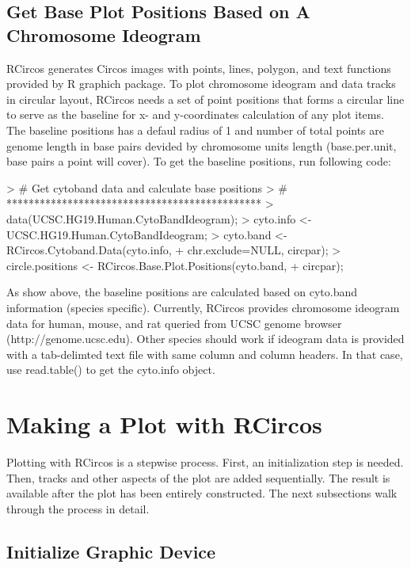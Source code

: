 \documentclass{article}
\begin{document}
\subsection{Get Base Plot Positions Based on A Chromosome Ideogram}

RCircos generates Circos images with points, lines, polygon, and text functions provided by R graphich package. To plot chromosome ideogram and data tracks in circular layout, RCircos needs a set of point positions that forms a circular line to serve as the baseline for x- and y-coordinates calculation of any plot items. The baseline positions has a defaul radius of 1 and number of total points are genome length in base pairs devided by chromosome units length (base.per.unit, base pairs a point will cover).  To get the baseline positions, run following code:

\begin{Schunk}
\begin{Sinput}
> #	Get cytoband data and calculate base positions
> #	**********************************************
> data(UCSC.HG19.Human.CytoBandIdeogram);
> cyto.info <- UCSC.HG19.Human.CytoBandIdeogram;
> cyto.band <- RCircos.Cytoband.Data(cyto.info, 
+ 			chr.exclude=NULL, circpar);
> circle.positions <- RCircos.Base.Plot.Positions(cyto.band, 
+ 			circpar);
\end{Sinput}
\end{Schunk}

As show above, the baseline positions are calculated based on cyto.band information (species specific). Currently, RCircos provides chromosome ideogram data for human, mouse, and rat queried from UCSC genome browser \\ 
(http://genome.ucsc.edu). Other species should work if ideogram data is provided with a tab-delimted text file with same column and column headers. In that case, use read.table() to get the cyto.info object.


\section{Making a Plot with RCircos}
Plotting with RCircos is a stepwise process.  First, an initialization step is needed.  Then, tracks and other aspects of the plot are added sequentially.  The result is available after the plot has been entirely constructed.  The next subsections walk through the process in detail.

\subsection{Initialize Graphic Device}
\end{document}
